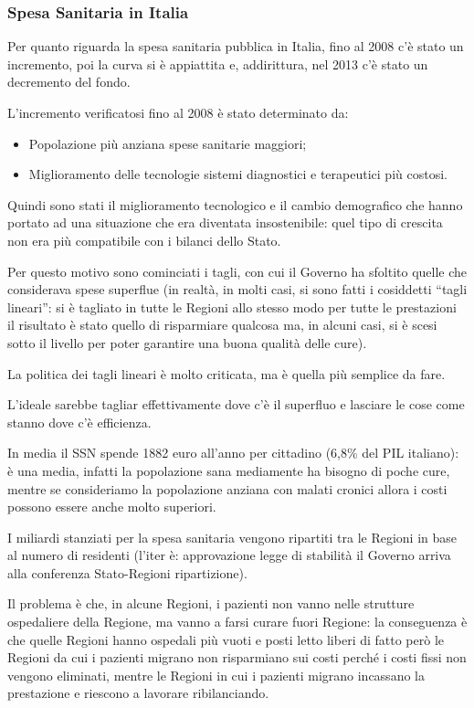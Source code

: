\subsubsection{Spesa Sanitaria in Italia}

Per quanto riguarda la spesa sanitaria pubblica in Italia, fino al 2008 c'è stato un incremento, poi la curva si è appiattita e, addirittura, nel 2013 c'è stato un decremento del fondo.

L'incremento verificatosi fino al 2008 è stato determinato da:

\begin{itemize}
\item
  Popolazione più anziana spese sanitarie maggiori;
\item
  Miglioramento delle tecnologie sistemi diagnostici e terapeutici più
  costosi.
\end{itemize}

Quindi sono stati il miglioramento tecnologico e il cambio demografico che hanno portato ad una situazione che era diventata insostenibile: quel tipo di crescita non era più compatibile con i bilanci dello Stato.

Per questo motivo sono cominciati i tagli, con cui il Governo ha sfoltito quelle che considerava spese superflue (in realtà, in molti casi, si sono fatti i cosiddetti ``tagli lineari'': si è tagliato in tutte le Regioni allo stesso modo per tutte le prestazioni il risultato è stato quello di risparmiare qualcosa ma, in alcuni casi, si è scesi sotto il livello per poter garantire una buona qualità delle cure).

La politica dei tagli lineari è molto criticata, ma è quella più semplice da fare.

L'ideale sarebbe tagliar effettivamente dove c'è il superfluo e lasciare le cose come stanno dove c'è efficienza.

In media il SSN spende 1882 euro all'anno per cittadino (6,8\% del PIL italiano): è una media, infatti la popolazione sana mediamente ha bisogno di poche cure, mentre se consideriamo la popolazione anziana con malati cronici allora i costi possono essere anche molto superiori.

I miliardi stanziati per la spesa sanitaria vengono ripartiti tra le Regioni in base al numero di residenti (l'iter è: approvazione legge di stabilità il Governo arriva alla conferenza Stato-Regioni ripartizione).

Il problema è che, in alcune Regioni, i pazienti non vanno nelle strutture ospedaliere della Regione, ma vanno a farsi curare fuori Regione: la conseguenza è che quelle Regioni hanno ospedali più vuoti e posti letto liberi di fatto però le Regioni da cui i pazienti migrano non risparmiano sui costi perché i costi fissi non vengono eliminati, mentre le Regioni in cui i pazienti migrano incassano la prestazione e riescono a lavorare ribilanciando.

